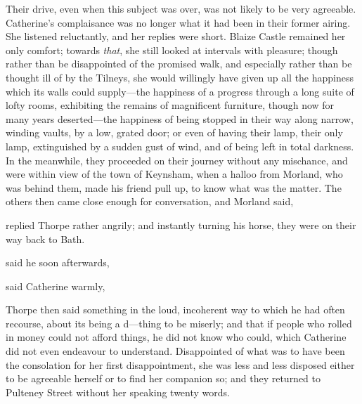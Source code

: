 Their drive, even when this subject was over, was not likely to be very agreeable. Catherine's complaisance was no longer what it had been in their former airing. She listened reluctantly, and her replies were short. Blaize Castle remained her only comfort; towards {\em that}, she still looked at intervals with pleasure; though rather than be disappointed of the promised walk, and especially rather than be thought ill of by the Tilneys, she would willingly have given up all the happiness which its walls could supply---the happiness of a progress through a long suite of lofty rooms, exhibiting the remains of magnificent furniture, though now for many years deserted---the happiness of being stopped in their way along narrow, winding vaults, by a low, grated door; or even of having their lamp, their only lamp, extinguished by a sudden gust of wind, and of being left in total darkness. In the meanwhile, they proceeded on their journey without any mischance, and were within view of the town of Keynsham, when a halloo from Morland, who was behind them, made his friend pull up, to know what was the matter. The others then came close enough for conversation, and Morland said, 

 replied Thorpe rather angrily; and instantly turning his horse, they were on their way back to Bath.

 said he soon afterwards, 

 said Catherine warmly, 




 Thorpe then said something in the loud, incoherent way to which he had often recourse, about its being a d---thing to be miserly; and that if people who rolled in money could not afford things, he did not know who could, which Catherine did not even endeavour to understand. Disappointed of what was to have been the consolation for her first disappointment, she was less and less disposed either to be agreeable herself or to find her companion so; and they returned to Pulteney Street without her speaking twenty words.

